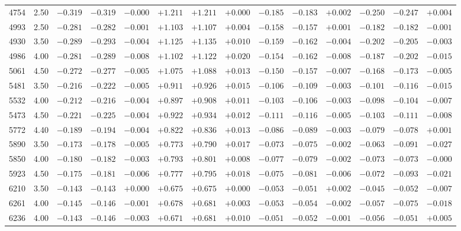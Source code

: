 \documentclass[]{aa}
\begin{document}
\begin{appendix}
\begin{table*}
\begin{center}
\begin{tabular}{llllllllllllll}
4754  &2.50& $ -0.319$&$  -0.319$&$  -0.000$&$  +1.211$&$  +1.211$&$  +0.000$&$  -0.185$&$  -0.183$&$  +0.002$&$  -0.250$&$-0.247$&$+0.004$\\
4993  &2.50& $ -0.281$&$  -0.282$&$  -0.001$&$  +1.103$&$  +1.107$&$  +0.004$&$  -0.158$&$  -0.157$&$  +0.001$&$  -0.182$&$-0.182$&$-0.001$\\
4930  &3.50& $ -0.289$&$  -0.293$&$  -0.004$&$  +1.125$&$  +1.135$&$  +0.010$&$  -0.159$&$  -0.162$&$  -0.004$&$  -0.202$&$-0.205$&$-0.003$\\
4986  &4.00& $ -0.281$&$  -0.289$&$  -0.008$&$  +1.102$&$  +1.122$&$  +0.020$&$  -0.154$&$  -0.162$&$  -0.008$&$  -0.187$&$-0.202$&$-0.015$\\
5061  &4.50& $ -0.272$&$  -0.277$&$  -0.005$&$  +1.075$&$  +1.088$&$  +0.013$&$  -0.150$&$  -0.157$&$  -0.007$&$  -0.168$&$-0.173$&$-0.005$\\
5481  &3.50& $ -0.216$&$  -0.222$&$  -0.005$&$  +0.911$&$  +0.926$&$  +0.015$&$  -0.106$&$  -0.109$&$  -0.003$&$  -0.101$&$-0.116$&$-0.015$\\
5532  &4.00& $ -0.212$&$  -0.216$&$  -0.004$&$  +0.897$&$  +0.908$&$  +0.011$&$  -0.103$&$  -0.106$&$  -0.003$&$  -0.098$&$-0.104$&$-0.007$\\
5473  &4.50& $ -0.221$&$  -0.225$&$  -0.004$&$  +0.922$&$  +0.934$&$  +0.012$&$  -0.111$&$  -0.116$&$  -0.005$&$  -0.103$&$-0.111$&$-0.008$\\
5772  &4.40& $ -0.189$&$  -0.194$&$  -0.004$&$  +0.822$&$  +0.836$&$  +0.013$&$  -0.086$&$  -0.089$&$  -0.003$&$  -0.079$&$-0.078$&$+0.001$\\
5890  &3.50& $ -0.173$&$  -0.178$&$  -0.005$&$  +0.773$&$  +0.790$&$  +0.017$&$  -0.073$&$  -0.075$&$  -0.002$&$  -0.063$&$-0.091$&$-0.027$\\
5850  &4.00& $ -0.180$&$  -0.182$&$  -0.003$&$  +0.793$&$  +0.801$&$  +0.008$&$  -0.077$&$  -0.079$&$  -0.002$&$  -0.073$&$-0.073$&$-0.000$\\
5923  &4.50& $ -0.175$&$  -0.181$&$  -0.006$&$  +0.777$&$  +0.795$&$  +0.018$&$  -0.075$&$  -0.081$&$  -0.006$&$  -0.072$&$-0.093$&$-0.021$\\
6210  &3.50& $ -0.143$&$  -0.143$&$  +0.000$&$  +0.675$&$  +0.675$&$  +0.000$&$  -0.053$&$  -0.051$&$  +0.002$&$  -0.045$&$-0.052$&$-0.007$\\
6261  &4.00& $ -0.145$&$  -0.146$&$  -0.001$&$  +0.678$&$  +0.681$&$  +0.003$&$  -0.053$&$  -0.054$&$  -0.002$&$  -0.057$&$-0.075$&$-0.018$\\
6236  &4.00& $ -0.143$&$  -0.146$&$  -0.003$&$  +0.671$&$  +0.681$&$  +0.010$&$  -0.051$&$  -0.052$&$  -0.001$&$  -0.056$&$-0.051$&$+0.005$\\

\end{tabular}
\end{center}
\end{table*}
\end{appendix}
\end{document}
